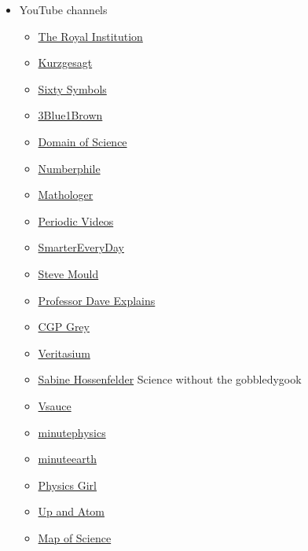 \documentclass{article}
\begin{document}
\begin{itemize}
    \item YouTube channels
    \begin{itemize}
    \item \href{https://www.youtube.com/user/TheRoyalInstitution}{The Royal Institution}
    \item \href{https://www.youtube.com/user/Kurzgesagt}{Kurzgesagt}
    \item \href{https://www.youtube.com/user/sixtysymbols}{Sixty Symbols}
    \item \href{https://www.youtube.com/channel/UCYO_jab_esuFRV4b17AJtAw}{3Blue1Brown}
    \item \href{https://www.youtube.com/channel/UCxqAWLTk1CmBvZFPzeZMd9A}{Domain of Science}
    \item \href{https://www.youtube.com/channel/UCoxcjq-8xIDTYp3uz647V5A}{Numberphile}
    \item \href{https://www.youtube.com/channel/UC1_uAIS3r8Vu6JjXWvastJg}{Mathologer}
    \item \href{https://www.youtube.com/channel/UCtESv1e7ntJaLJYKIO1FoYw}{Periodic Videos}
    \item \href{https://www.youtube.com/channel/UC6107grRI4m0o2-emgoDnAA}{SmarterEveryDay}
    \item \href{https://www.youtube.com/channel/UCEIwxahdLz7bap-VDs9h35A}{Steve Mould}
    \item \href{https://www.youtube.com/channel/UC0cd_-e49hZpWLH3UIwoWRA}{Professor Dave Explains}
    \item \href{https://www.youtube.com/channel/UC2C_jShtL725hvbm1arSV9w}{CGP Grey}
    \item \href{https://www.youtube.com/user/1veritasium}{Veritasium}
    \item \href{https://www.youtube.com/channel/UC1yNl2E66ZzKApQdRuTQ4tw}{Sabine Hossenfelder} Science without the gobbledygook
    \item \href{https://www.youtube.com/channel/UC6nSFpj9HTCZ5t-N3Rm3-HA}{Vsauce}
    \item \href{https://www.youtube.com/user/minutephysics}{minutephysics}
    \item \href{https://www.youtube.com/minuteearth}{minuteearth}
    \item \href{https://www.youtube.com/channel/UC7DdEm33SyaTDtWYGO2CwdA}{Physics Girl}
    \item \href{https://www.youtube.com/channel/UCSIvk78tK2TiviLQn4fSHaw}{Up and Atom}
    \item \href{https://www.youtube.com/playlist?list=PLOYRlicwLG3St5aEm02ncj-sPDJwmojIS}{Map of Science}

\end{itemize}
\end{itemize}
\end{document}
